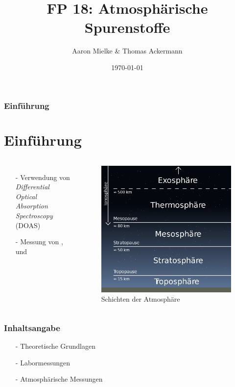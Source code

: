 \documentclass{beamer}
\title{FP 18: Atmosphärische Spurenstoffe}
\author{Aaron Mielke \& Thomas Ackermann}
\date{\today}
\begin{document}
\maketitle


\begin{frame}
	\frametitle{Einführung}
    \section{Einführung}
    \begin{columns}
        \begin{itemize}
            \item[-] Verwendung von \textit{Differential Optical Absorption Spectroscopy} (DOAS) 
            \item[-] Messung von ,  und  
        \end{itemize}
    \begin{figure}
        \includegraphics[width=\textwidth]{fig/photo/erdatmosphäre.png}
        \caption{Schichten der Atmosphäre}
    \end{figure}
    \end{columns}
\end{frame}


\begin{frame}
    \frametitle{Inhaltsangabe}
    \begin{itemize}
        \item[-] Theoretische Grundlagen
    \vfill
		\item[-] Labormessungen
    \vfill
		\item[-] Atmosphärische Messungen 
	\end{itemize}
\end{frame}
\end{document}
